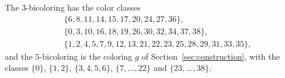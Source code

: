 \documentclass[11pt]{article}
\theoremstyle{definition}
\begin{document}
\begin{appendices}
\medskip
The $3$-bicoloring has the color classes
\begin{align*}
&\{6,8,11,14,15,17,20,24,27,36\},\\
&\{0,3,10,16,18,19,26,30,32,34,37,38\},\\
&\{1,2,4,5,7,9,12,13,21,22,23,25,28,29,31,33,35\},
\end{align*}
and the $5$-bicoloring is the coloring $g$ of
Section~\ref{sec:construction}, with the classes $\{0\}$, $\{1,2\}$,
$\{3,4,5,6\}$, $\{7,\dots,22\}$ and $\{23,\dots,38\}$.
\end{appendices}
\end{document}
